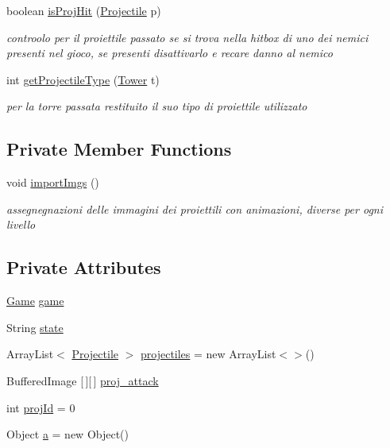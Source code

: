 \begin{DoxyCompactItemize}
boolean \hyperlink{classmanagers_1_1_projectile_manager_a90bf53002c3a067a25aba3e876974051}{is\+Proj\+Hit} (\hyperlink{classobjects_1_1_projectile}{Projectile} p)
\begin{DoxyCompactList}\small\item\em controolo per il proiettile passato se si trova nella hitbox di uno dei nemici presenti nel gioco, se presenti disattivarlo e recare danno al nemico \end{DoxyCompactList}\item 
int \hyperlink{classmanagers_1_1_projectile_manager_a942d732bac65df2f0d220989ca42ce76}{get\+Projectile\+Type} (\hyperlink{classtowers_1_1_tower}{Tower} t)
\begin{DoxyCompactList}\small\item\em per la torre passata restituito il suo tipo di proiettile utilizzato \end{DoxyCompactList}\end{DoxyCompactItemize}
\subsection*{Private Member Functions}
\begin{DoxyCompactItemize}
\item 
void \hyperlink{classmanagers_1_1_projectile_manager_a78da03d9c5782fb25189cee3d4c78bfd}{import\+Imgs} ()
\begin{DoxyCompactList}\small\item\em assegnegnazioni delle immagini dei proiettili con animazioni, diverse per ogni livello \end{DoxyCompactList}\end{DoxyCompactItemize}
\subsection*{Private Attributes}
\begin{DoxyCompactItemize}
\item 
\hyperlink{classprogetto_1_1_game}{Game} \hyperlink{classmanagers_1_1_projectile_manager_ac6a5ed6191fcf3a5bf0445921feb4f48}{game}
\item 
String \hyperlink{classmanagers_1_1_projectile_manager_a91ac952876f776b3fbbc8519e093fdbf}{state}
\item 
Array\+List$<$ \hyperlink{classobjects_1_1_projectile}{Projectile} $>$ \hyperlink{classmanagers_1_1_projectile_manager_ab15956ed089bc9c0fb7ba6c8494fe5c7}{projectiles} = new Array\+List$<$$>$()
\item 
Buffered\+Image \mbox{[}$\,$\mbox{]}\mbox{[}$\,$\mbox{]} \hyperlink{classmanagers_1_1_projectile_manager_a0775275621287d6a169fe51df5c2dc4e}{proj\+\_\+attack}
\item 
int \hyperlink{classmanagers_1_1_projectile_manager_a9705bce400d9f98d3cb9f77460f99aad}{proj\+Id} = 0
\item 
Object \hyperlink{classmanagers_1_1_projectile_manager_ac80b5c0270d7b9599820bd4d0815bd32}{a} = new Object()
\end{DoxyCompactItemize}


